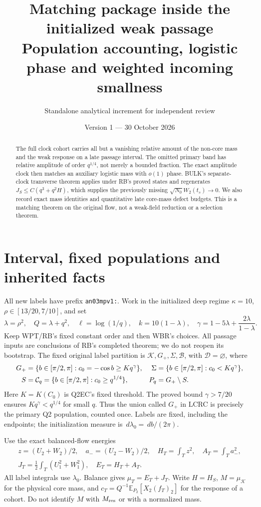 \documentclass[11pt]{article}
\title{Matching package inside the initialized weak passage\\
Population accounting, logistic phase and weighted incoming smallness}
\author{Standalone analytical increment for independent review}
\date{Version 1 --- 30 October 2026}
\numberwithin{equation}{section}
\theoremstyle{remark}\newtheorem{remark}[theorem]{Remark}
\newcommand{\dd}{\,d}\newcommand{\E}{\mathbb E}
\newcommand{\KK}{\mathcal K}\newcommand{\BB}{\mathcal B}
\newcommand{\Gp}{{G_+}}\newcommand{\Clk}{\mathcal C_q}
\begin{document}
\maketitle
\begin{abstract}
The full clock cohort carries all but a vanishing relative amount of
the non-core mass and the weak response on a late passage interval.
The omitted primary band has relative amplitude of order $q^{1/4}$,
not merely a bounded fraction. The exact amplitude clock then matches
an auxiliary logistic mass with $o(1)$ phase. BULK's separate-clock
transverse theorem applies under RB's proved states and regenerates
$J_S\le C(q^3+q^2H)$, which supplies the previously missing
$\sqrt{N_0}W_2(t_s)\to0$. We also record exact mass identities and
quantitative late core-mass defect budgets. This is a matching theorem
on the original flow, not a weak-field reduction or a selection theorem.
\end{abstract}

\section{Interval, fixed populations and inherited facts}
\label{an03mpv1:setup}
All new labels have prefix \texttt{an03mpv1:}. Work in the initialized
deep regime $\kappa=10$, $\rho\in[13/20,7/10]$, and set
\[
 \lambda=\rho^2,\quad Q=\lambda+q^2,\quad \ell=\log(1/q),
 \quad k=10(1-\lambda),\quad
 \gamma=1-5\lambda+\frac{2\lambda}{1-\lambda}.
\]
Keep WPT/RB's fixed constant order and then WBR's choices.
All passage inputs are conclusions of RB's completed theorem;
we do not reopen its bootstrap. The fixed original label partition is
$\KK,\Gp,\Sigma,\BB$, with $\mathcal D=\varnothing$, where
\begin{align}
 \Gp&=\{b\in[\pi/2,\pi]:c_0=-\cos b\ge Kq^\gamma\},
 &\Sigma&=\{b\in[\pi/2,\pi]:c_0<Kq^\gamma\},\notag\\
 S&=\Clk=\{b\in[\pi/2,\pi]:c_0\ge q^{1/4}\},
 &P_q&=\Gp\setminus S.
 \label{an03mpv1:partition}
\end{align}
Here $K=K(C_0)$ is Q2EC's fixed threshold. The proved bound
$\gamma>7/20$ ensures $Kq^\gamma<q^{1/4}$ for small $q$.
Thus the union called $\Gp$ in LCRC is precisely the primary Q2
population, counted once. Labels are fixed, including the endpoints;
the initialization measure is $\dd\lambda_0=\dd b/(2\pi)$.

Use the exact balanced-flow energies
\begin{gather*}
 z=(U_2+W_2)/2,\quad a_-=(U_2-W_2)/2,\quad
 H_T=\int_Tz^2,\quad A_T=\int_Ta_-^2,\\
 J_T=\tfrac12\int_T(U_1^2+W_1^2),\quad E_T=H_T+A_T.
\end{gather*}
All label integrals use $\lambda_0$. Balance gives $\mu_T=E_T+J_T$.
Write $H=H_S$, $M=\mu_\KK$ for the physical core mass, and
$c_T=Q^{-1}\E_{P_2}[X_2(f_T)_2]$ for the response of a cohort.
Do not identify $M$ with $M_{\rm res}$ or with a normalized mass.
\end{document}
